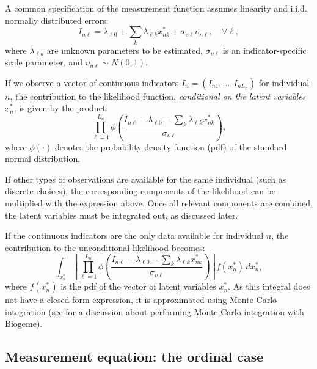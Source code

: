 \documentclass[12pt,a4paper]{article}
\begin{document}
A common specification of the measurement function assumes linearity
and i.i.d. normally distributed errors:
\begin{equation}
\label{eq:linearMeasurement}
I_{n\ell} = \lambda_{\ell 0} + \sum_k \lambda_{\ell k}  x_{nk}^* + \sigma_{\upsilon \ell} \upsilon_{n\ell}, \quad \forall \ell,
\end{equation}
where $\lambda_{\ell k}$ are unknown parameters to be estimated, $\sigma_{\upsilon \ell}$ is an indicator-specific scale parameter, and $\upsilon_{n\ell} \sim N(0, 1)$.

If we observe a vector of continuous indicators \( I_n = (I_{n1}, \ldots, I_{nL_n}) \) for individual \( n \), the contribution to the likelihood function, \emph{conditional on the latent variables} \( x^*_{n} \), is given by the product:
\begin{equation}
  \label{eq:conditional_likelihood_continuous}
\prod_{\ell=1}^{L_n} \phi\left( \frac{I_{n\ell} - \lambda_{\ell 0} - \sum_k \lambda_{\ell k} x_{nk}^*}{\sigma_{\upsilon \ell}} \right),
\end{equation}
where \( \phi(\cdot) \) denotes the probability density function (pdf) of the standard normal distribution.

If other types of observations are available for the same individual (such as discrete choices), the corresponding components of the likelihood can be multiplied with the expression above. Once all relevant components are combined, the latent variables must be integrated out, as discussed later.

If the continuous indicators are the only data available for individual \( n \), the contribution to the unconditional likelihood becomes:
\begin{equation}
  \label{eq:likelihood_continuous}
\int_{x_n^*} \left[ \prod_{\ell=1}^{L_n} \phi\left( \frac{I_{n\ell} - \lambda_{\ell 0} - \sum_k \lambda_{\ell k} x_{nk}^*}{\sigma_{\upsilon \ell}} \right) \right] f(x_n^*) \, dx_n^*,
\end{equation}
where \( f(x_n^*) \) is the pdf of the vector of latent variables \( x_n^* \).
As this integral does not have a closed-form expression, it is approximated using Monte Carlo integration (see \cite{Bier19} for a discussion about performing Monte-Carlo integration with Biogeme).




\subsection{Measurement equation: the ordinal case}
\label{sec:likert}
\end{document}

